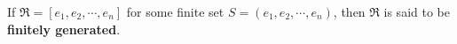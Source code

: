 If $\mathfrak{R} = [e_1, e_2, \cdots, e_n]$ for some finite set $S = (e_1, e_2, \cdots, e_n)$, then $\mathfrak{R}$ is said to be \textbf{finitely generated}.
